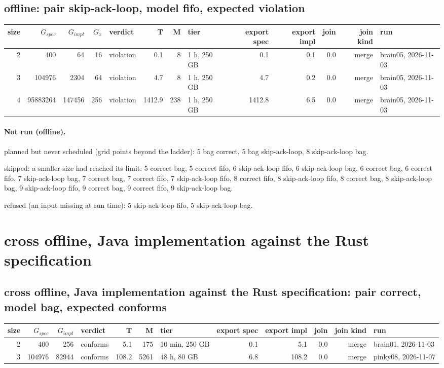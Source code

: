 \documentclass[10pt]{article}
\begin{document}
\subsection*{offline: pair \textsf{skip-ack-loop}, model fifo, expected violation}
\begin{longtable}{@{}rrrrlrrlrrrrl@{}}
\toprule
size & $G_{\mathit{spec}}$ & $G_{\mathit{impl}}$ & $G_x$ & verdict & T & M & tier & export spec & export impl & join & join kind & run \\
\midrule
\endhead
\color{blue} 2 & 400 & 64 & 16 & violation & 0.1 & 8 & 1 h, 250 GB & 0.1 & 0.1 & 0.0 & merge & brain05, 2026-11-03 \\
\color{blue} 3 & 104976 & 2304 & 64 & violation & 4.7 & 8 & 1 h, 250 GB & 4.7 & 0.2 & 0.0 & merge & brain05, 2026-11-03 \\
\color{blue} 4 & 95883264 & 147456 & 256 & violation & 1412.9 & 238 & 1 h, 250 GB & 1412.8 & 6.5 & 0.0 & merge & brain05, 2026-11-03 \\
\bottomrule
\end{longtable}
\paragraph{Not run (offline).}
planned but never scheduled (grid points beyond the ladder): 5 bag correct, 5 bag skip-ack-loop, 8 skip-ack-loop bag.\par
skipped: a smaller size had reached its limit: 5 correct bag, 5 correct fifo, 6 skip-ack-loop fifo, 6 skip-ack-loop bag, 6 correct bag, 6 correct fifo, 7 skip-ack-loop bag, 7 correct bag, 7 correct fifo, 7 skip-ack-loop fifo, 8 correct fifo, 8 skip-ack-loop fifo, 8 correct bag, 8 skip-ack-loop bag, 9 skip-ack-loop fifo, 9 correct bag, 9 correct fifo, 9 skip-ack-loop bag.\par
refused (an input missing at run time): 5 skip-ack-loop fifo, 5 skip-ack-loop bag.\par
\section*{cross offline, Java implementation against the Rust specification}
\subsection*{cross offline, Java implementation against the Rust specification: pair \textsf{correct}, model bag, expected conforms}
\begin{longtable}{@{}rrrlrrlrrrrl@{}}
\toprule
size & $G_{\mathit{spec}}$ & $G_{\mathit{impl}}$ & verdict & T & M & tier & export spec & export impl & join & join kind & run \\
\midrule
\endhead
\color{blue} 2 & 400 & 256 & conforms & 5.1 & 175 & 10 min, 250 GB & 0.1 & 5.1 & 0.0 & merge & brain01, 2026-11-03 \\
\color{red} 3 & 104976 & 82944 & conforms & 108.2 & 5261 & 48 h, 80 GB & 6.8 & 108.2 & 0.0 & merge & pinky08, 2026-11-07 \\
\bottomrule
\end{longtable}
\end{document}
